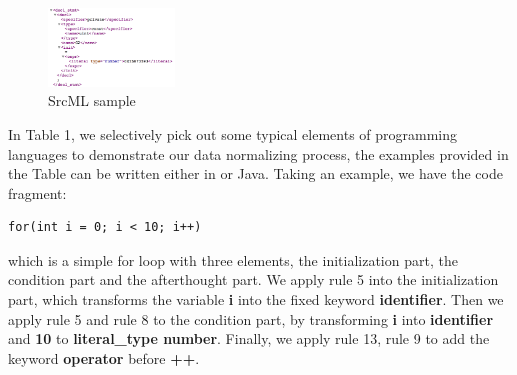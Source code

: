 \begin{figure}[t!]
	
	\includegraphics[width=0.3\textwidth]{srcml_sample}
	\caption{SrcML sample}
	\label{fig:srcml_sample}
\end{figure}

In Table 1, we selectively pick out some typical elements of programming languages to demonstrate our data normalizing process, the examples provided in the Table can be written either in  or Java. Taking an example, we have the code fragment: 

\begin{lstlisting}
for(int i = 0; i < 10; i++)
\end{lstlisting}

which is a simple for loop with three elements, the initialization part, the condition part and the afterthought part. We apply rule 5 into the initialization part, which transforms the variable \textbf{i} into the fixed keyword \textbf{identifier}. Then we apply rule 5 and rule 8 to the condition part, by transforming \textbf{i} into \textbf{identifier} and \textbf{10} to \textbf{literal\_type number}. Finally, we apply rule 13, rule 9 to add the keyword \textbf{operator} before \textbf{++}. 

